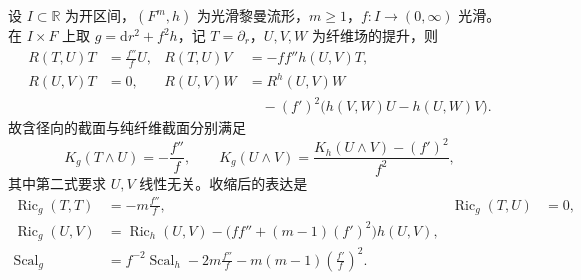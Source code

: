 \begin{proposition}\label{g3:prop:warped-product-curvature}
	设 \(I\subset\mathbb R\) 为开区间，\((F^m,h)\) 为光滑黎曼流形，\(m\ge1\)，\(f:I\to(0,\infty)\) 光滑。在 \(I\times F\) 上取 \(g=\mathrm dr^2+f^2h\)，记 \(T=\partial_r\)，\(U,V,W\) 为纤维场的提升，则
	\begin{equation}\label{g3:eq:warped-product-curvature}
		\begin{aligned}
			R(T,U)T&=\frac{f''}{f}U,&
			R(T,U)V&=-ff''h(U,V)T,\\
			R(U,V)T&=0,&
			R(U,V)W&=R^h(U,V)W\\
			&&&\quad-(f')^2\bigl(h(V,W)U-h(U,W)V\bigr).
		\end{aligned}
	\end{equation}
	故含径向的截面与纯纤维截面分别满足
	\begin{equation}\label{g3:eq:warped-sectional-curvatures}
		K_g(T\wedge U)=-\frac{f''}{f},\qquad
		K_g(U\wedge V)=\frac{K_h(U\wedge V)-(f')^2}{f^2},
	\end{equation}
	其中第二式要求 \(U,V\) 线性无关。收缩后的表达是
	\begin{equation}\label{g3:eq:warped-ricci-scalar}
		\begin{aligned}
			\operatorname{Ric}_g(T,T)&=-m\frac{f''}{f},&
			\operatorname{Ric}_g(T,U)&=0,\\
			\operatorname{Ric}_g(U,V)&=\operatorname{Ric}_h(U,V)
			-\bigl(ff''+(m-1)(f')^2\bigr)h(U,V),\\
			\operatorname{Scal}_g&=f^{-2}\operatorname{Scal}_h
			-2m\frac{f''}{f}-m(m-1)\left(\frac{f'}f\right)^2.
		\end{aligned}
	\end{equation}
\end{proposition}
